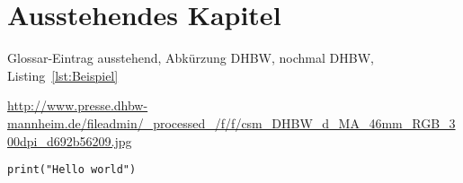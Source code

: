 \section{Ausstehendes Kapitel}

Glossar\hyp{}Eintrag \gls{ausstehend}, Abkürzung \ac{DHBW}, nochmal \ac{DHBW}, Listing~\ref{lst:Beispiel}

\begin{sloppypar}
\url{http://www.presse.dhbw-mannheim.de/fileadmin/_processed_/f/f/csm_DHBW_d_MA_46mm_RGB_300dpi_d692b56209.jpg} %
\end{sloppypar}

\begin{lstfloat}
\begin{lstlisting}
print("Hello world")
\end{lstlisting}
\end{lstfloat}
